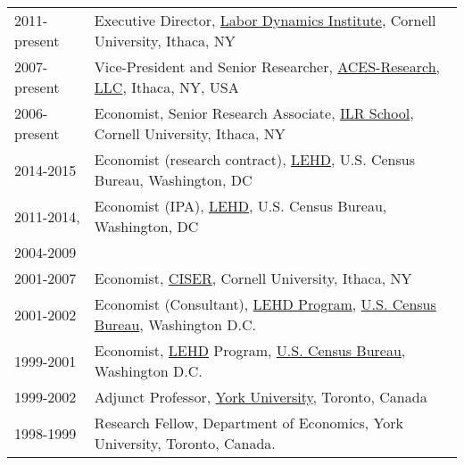 \documentclass[10pt,letterpaper]{article}
\begin{document}
\begin{longtable}{p{1in}p{5.3in}}
2011-present    & Executive Director, 
\href{http://www.ilr.cornell.edu/ldi}{Labor Dynamics Institute}, %
Cornell University, Ithaca, NY %
\\%
2007-present    & Vice-President and Senior Researcher, 
\href{http://www.aces-research.com}{ACES-Research, LLC}, Ithaca,
NY, USA\\%
2006-present    & Economist, Senior Research Associate, 
\href{http://www.ilr.cornell.edu}{ILR School}, Cornell University, Ithaca,
NY %
\\%
2014-2015 & Economist (research contract), 
\href{http://lehd.ces.census.gov}{LEHD}, U.S. Census Bureau, Washington,
DC %
\\%
2011-2014, & Economist (IPA), 
\href{http://lehd.ces.census.gov}{LEHD}, U.S. Census Bureau, Washington,
DC %
\\%
2004-2009   &%
\\%
2001-2007    & Economist, 
\href{http://www.ciser.cornell.edu}{CISER}, Cornell University, Ithaca,
NY %
\\%
2001-2002    &Economist (Consultant), \href{http://lehd.ces.census.gov}{LEHD Program}, 
\href{http://www.census.gov}{U.S. Census Bureau}, Washington D.C. %
\\[.3cm]

1999-2001    &Economist,  \href{http://lehd.ces.census.gov}{LEHD} Program, \href{http://www.census.gov}{U.S. Census Bureau}, Washington D.C. %
\\[.3cm]
1999-2002    &Adjunct Professor, \href{http://econ.yorku.ca}{York University}, Toronto, Canada\\
1998-1999    &Research Fellow, 
Department of Economics, York University,
Toronto, Canada. \\[-.8cm]
\end{longtable}
\end{document}
